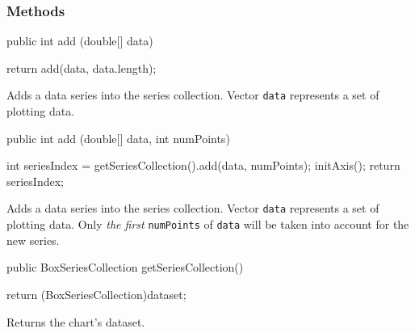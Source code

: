 \subsubsection*{Methods}

\begin{code}

   public int add (double[] data) \begin{hide} {
      return add(data, data.length);
   }\end{hide}
\end{code}
\begin{tabb}
   Adds a data series into the series collection. Vector \texttt{data} represents
   a set of plotting data.
\end{tabb}
\begin{htmlonly}
\end{htmlonly}
\begin{code}

   public int add (double[] data, int numPoints) \begin{hide} {
      int seriesIndex = getSeriesCollection().add(data, numPoints);
      initAxis();
      return seriesIndex;
   }\end{hide}
\end{code}
\begin{tabb}
   Adds a data series into the series collection. Vector \texttt{data} represents
   a set of plotting data. Only \emph{the first} \texttt{numPoints} of
   \texttt{data} will be taken into account for the new series.
\end{tabb}
\begin{htmlonly}
\end{htmlonly}
\begin{code}

   public BoxSeriesCollection getSeriesCollection() \begin{hide} {
      return (BoxSeriesCollection)dataset;
   }\end{hide}
\end{code}
\begin{tabb}
   Returns the chart's dataset.
\end{tabb}
\begin{htmlonly}
\end{htmlonly}
